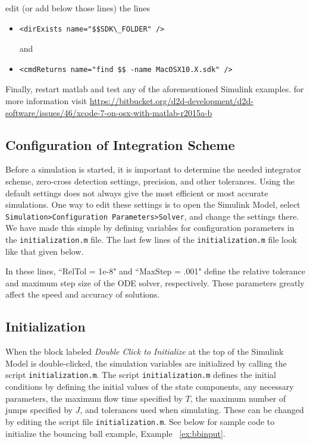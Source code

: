 \documentclass{article}
\begin{document}
\begin{itemize}
edit (or add below those lines) the lines
\begin{itemize}
\item
\begin{verbatim}
<dirExists name="$$SDK\_FOLDER" />
\end{verbatim}
and
\item
\begin{verbatim}
<cmdReturns name="find $$ -name MacOSX10.X.sdk" />
\end{verbatim}
\end{itemize}

Finally, restart matlab and test any of the aforementioned Simulink examples.
for more information visit {\footnotesize\url{https://bitbucket.org/d2d-development/d2d-software/issues/46/xcode-7-on-osx-with-matlab-r2015a-b}}

\end{itemize}

    
\subsection{Configuration of Integration Scheme}
Before a simulation is started, it is important to determine the needed integrator scheme, zero-cross detection settings, precision, and other tolerances. Using the default settings does not always give the most efficient or most accurate simulations. One way to edit these settings is to open the Simulink Model, select {\tt Simulation>Configuration Parameters>Solver}, and change the settings there. We have made this simple by defining variables for configuration parameters in the {\tt initialization.m} file. The last few lines of the {\tt initialization.m} file look like that given below.\\

% 
\label{scr:config_inst}

In these lines, ``RelTol = 1e-8" and ``MaxStep = .001" define the relative tolerance  and maximum step size of the ODE solver, respectively. These parameters greatly affect the speed and accuracy of solutions.

\subsection{Initialization}

When the block labeled {\em Double Click to Initialize} at the top of the Simulink Model is double-clicked, the simulation variables are initialized by calling the script {\tt initialization.m}. The script {\tt initialization.m} defines the initial conditions by defining the initial values of the state components, any necessary parameters, the maximum flow time specified by $T$, the maximum number of jumps specified by $J$, and tolerances used when simulating. These can be changed by editing the script file {\tt initialization.m}. See below for sample code to initialize the bouncing ball example, Example ~\ref{ex:bbinput}.\\
\end{document}
